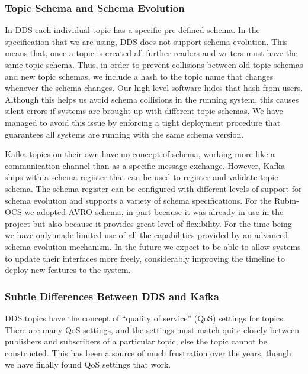\documentclass[]{spie}  %
\begin{document}
\subsubsection{Topic Schema and Schema Evolution}
\label{subsubsec:schema_evolution}

In DDS each individual topic has a specific pre-defined schema.
In the specification that we are using, DDS does not support schema evolution.
This means that, once a topic is created all further readers and writers must have the same topic schema.
Thus, in order to prevent collisions between old topic schemas and new topic schemas, we include a hash to the topic name that changes whenever the schema changes.
Our high-level software hides that hash from users.
Although this helps us avoid schema collisions in the running system, this causes silent errors if systems are brought up with different topic schemas.
We have managed to avoid this issue by enforcing a tight deployment procedure that guarantees all systems are running with the same schema version.

Kafka topics on their own have no concept of schema, working more like a communication channel than as a specific message exchange.
However, Kafka ships with a schema register that can be used to register and validate topic schema.
The schema register can be configured with different levels of support for schema evolution and supports a variety of schema specifications.
For the Rubin-OCS we adopted AVRO-schema, in part because it was already in use in the project but also because it provides great level of flexibility.
For the time being we have only made limited use of all the capabilities provided by an advanced schema evolution mechanism.
In the future we expect to be able to allow systems to update their interfaces more freely, considerably improving the timeline to deploy new features to the system.

\subsubsection{Subtle Differences Between DDS and Kafka}
\label{subsubsec:subtle_differences}

DDS topics have the concept of “quality of service” (QoS) settings for topics.
There are many QoS settings, and the settings must match quite closely between publishers and subscribers of a particular topic, else the topic cannot be constructed.
This has been a source of much frustration over the years, though we have finally found QoS settings that work.
\end{document}
